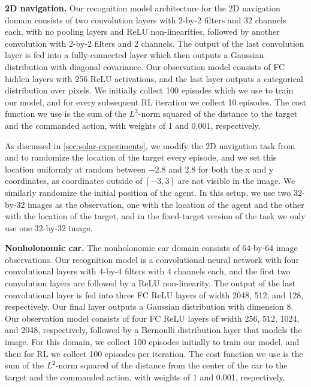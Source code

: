 {\bf 2D navigation.} Our recognition model architecture for the 2D navigation domain consists of two convolution layers with \mbox{2-by-2} filters and 32 channels each, with no pooling layers and ReLU non-linearities, followed by another convolution with \mbox{2-by-2} filters and 2 channels. The output of the last convolution layer is fed into a fully-connected layer which then outputs a Gaussian distribution with diagonal covariance. Our observation model consists of FC hidden layers with 256 ReLU activations, and the last layer outputs a categorical distribution over pixels. We initially collect 100 episodes which we use to train our model, and for every subsequent RL iteration we collect 10 episodes. The cost function we use is the sum of the $L^2$-norm squared of the distance to the target and the commanded action, with weights of 1 and 0.001, respectively.

As discussed in \autoref{sec:solar-experiments}, we modify the 2D navigation task from \citet{e2c} and \citet{rce} to randomize the location of the target every episode, and we set this location uniformly at random between $-2.8$ and $2.8$ for both the x and y coordinates, as coordinates outside of $[-3,3]$ are not visible in the image. We similarly randomize the initial position of the agent. In this setup, we use two \mbox{32-by-32} images as the observation, one with the location of the agent and the other with the location of the target, and in the fixed-target version of the task we only use one \mbox{32-by-32} image.

{\bf Nonholonomic car.} The nonholonomic car domain consists of \mbox{64-by-64} image observations. Our recognition model is a convolutional neural network with four convolutional layers with \mbox{4-by-4} filters with 4 channels each, and the first two convolution layers are followed by a ReLU non-linearity. The output of the last convolutional layer is fed into three FC ReLU layers of width 2048, 512, and 128, respectively. Our final layer outputs a Gaussian distribution with dimension 8. Our observation model consists of four FC ReLU layers of width 256, 512, 1024, and 2048, respectively, followed by a Bernoulli distribution layer that models the image. For this domain, we collect 100 episodes initially to train our model, and then for RL we collect 100 episodes per iteration. The cost function we use is the sum of the $L^2$-norm squared of the distance from the center of the car to the target and the commanded action, with weights of 1 and 0.001, respectively.


